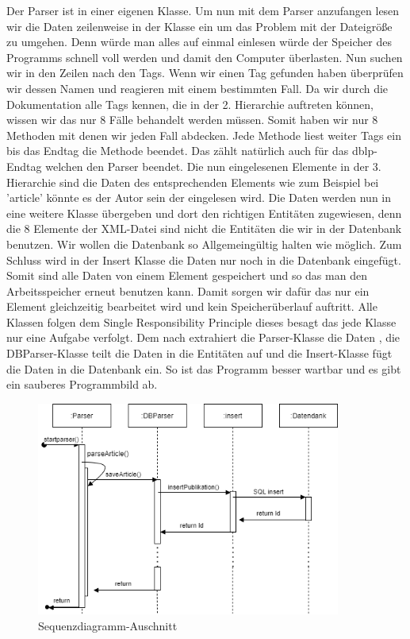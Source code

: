 Der Parser ist in einer eigenen Klasse. Um nun mit dem Parser anzufangen lesen wir die Daten zeilenweise in der Klasse ein um das Problem mit der Dateigröße zu umgehen. Denn würde man alles auf einmal einlesen würde der Speicher des Programms schnell voll werden und damit den Computer überlasten. Nun suchen wir in den Zeilen nach den Tags. Wenn wir einen Tag gefunden haben überprüfen wir dessen Namen und reagieren mit einem bestimmten Fall. Da wir durch die Dokumentation alle Tags kennen, die in der 2. Hierarchie auftreten können, wissen wir das nur 8 Fälle behandelt werden müssen. Somit haben wir nur 8 Methoden mit denen wir jeden Fall abdecken. Jede Methode liest weiter Tags ein bis das Endtag die Methode beendet. Das zählt natürlich auch für das dblp-Endtag welchen den Parser beendet. Die nun eingelesenen Elemente in der 3. Hierarchie sind die Daten des entsprechenden Elements wie zum Beispiel bei 'article' könnte es der Autor sein der eingelesen wird. Die Daten werden nun in eine weitere Klasse übergeben und dort den richtigen Entitäten zugewiesen, denn die 8 Elemente der XML-Datei sind nicht die Entitäten die wir in der Datenbank benutzen. Wir wollen die Datenbank so Allgemeingültig halten wie möglich. Zum Schluss wird in der Insert Klasse die Daten nur noch in die Datenbank eingefügt. Somit sind alle Daten von einem Element gespeichert und so das man den Arbeitsspeicher erneut benutzen kann. Damit sorgen wir dafür das nur ein Element gleichzeitig bearbeitet wird und kein Speicherüberlauf auftritt. Alle Klassen folgen dem Single Responsibility Principle dieses besagt das jede Klasse nur eine Aufgabe verfolgt. Dem nach extrahiert die Parser-Klasse die Daten , die DBParser-Klasse teilt die Daten in die Entitäten auf und die Insert-Klasse fügt die Daten in die Datenbank ein. So ist das Programm besser wartbar und es gibt ein sauberes Programmbild ab.
\begin{figure}[!htb]
	\centering
	\includegraphics[width=10cm,keepaspectratio]{bilder/SequenzDiagramParser}
	\caption{Sequenzdiagramm-Auschnitt}
	\label{fig:sequenzdiagramm}
\end{figure}

